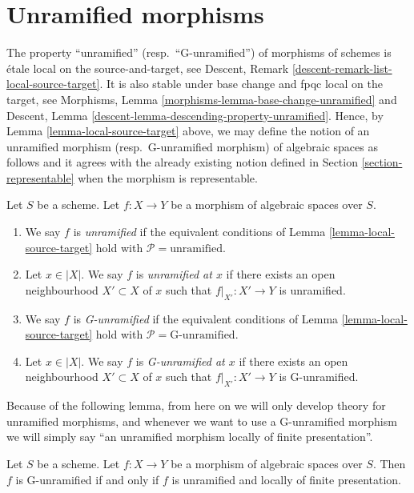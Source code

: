 \section{Unramified morphisms}
\label{section-unramified}

\noindent
The property ``unramified'' (resp.\ ``G-unramified'')
of morphisms of schemes is \'etale local on the source-and-target, see
Descent, Remark \ref{descent-remark-list-local-source-target}.
It is also stable under base change and fpqc local on the target, see
Morphisms, Lemma \ref{morphisms-lemma-base-change-unramified} and
Descent, Lemma \ref{descent-lemma-descending-property-unramified}.
Hence, by
Lemma \ref{lemma-local-source-target}
above, we may define the notion of an unramified morphism
(resp.\ G-unramified morphism) of algebraic spaces
as follows and it agrees with the already existing notion defined in
Section \ref{section-representable}
when the morphism is representable.

\begin{definition}
\label{definition-unramified}
Let $S$ be a scheme.
Let $f : X \to Y$ be a morphism of algebraic spaces over $S$.
\begin{enumerate}
\item We say $f$ is {\it unramified} if the equivalent conditions of
Lemma \ref{lemma-local-source-target}
hold with $\mathcal{P} = \text{unramified}$.
\item Let $x \in |X|$. We say $f$ is {\it unramified at $x$} if there
exists an open neighbourhood $X' \subset X$ of $x$ such that
$f|_{X'} : X' \to Y$ is unramified.
\item We say $f$ is {\it G-unramified} if the equivalent conditions of
Lemma \ref{lemma-local-source-target}
hold with $\mathcal{P} = \text{G-unramified}$.
\item Let $x \in |X|$. We say $f$ is {\it G-unramified at $x$} if there
exists an open neighbourhood $X' \subset X$ of $x$ such that
$f|_{X'} : X' \to Y$ is G-unramified.
\end{enumerate}
\end{definition}

\noindent
Because of the following lemma, from here on we will only develop theory
for unramified morphisms, and whenever we want to use a G-unramified
morphism we will simply say ``an unramified morphism locally of finite
presentation''.

\begin{lemma}
\label{lemma-unramified-G-unramified}
Let $S$ be a scheme.
Let $f : X \to Y$ be a morphism of algebraic spaces over $S$.
Then $f$ is G-unramified if and only if $f$ is unramified and
locally of finite presentation.
\end{lemma}

